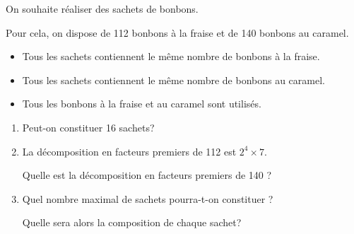 On souhaite réaliser des sachets de bonbons.

Pour cela, on dispose de 112 bonbons à la fraise et de 140 bonbons au caramel.

\begin{itemize}[left=5mm]
	\item Tous les sachets contiennent le même nombre de bonbons à la fraise.

	\item Tous les sachets contiennent le même nombre de bonbons au caramel.

	\item Tous les bonbons à la fraise et au caramel sont utilisés.
\end{itemize}

\begin{enumerate}
	\item Peut-on constituer 16 sachets?

	\item La décomposition en facteurs premiers de 112 est $2^{4} \times 7$.

	Quelle est la décomposition en facteurs premiers de 140 ?

	\item Quel nombre maximal de sachets pourra-t-on constituer ?

	Quelle sera alors la composition de chaque sachet?
\end{enumerate}
